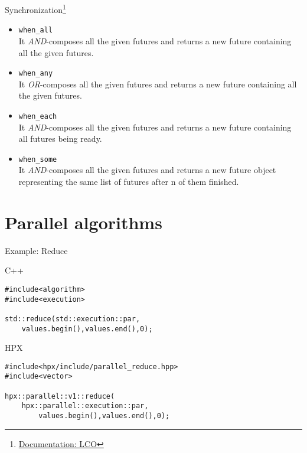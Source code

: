 \documentclass[12pt,t]{beamer}
\begin{document}
\begin{frame}[fragile]{Synchronization\footnote{\tiny\href{https://stellar-group.github.io/hpx/docs/sphinx/latest/html/terminology.html\#term-lco}{Documentation: LCO}}}

\begin{itemize}
\item \lstinline|when_all| \\
It \textit{AND}-composes all the given futures and returns a new future containing all the given futures.
\item \lstinline|when_any| \\
It \textit{OR}-composes all the given futures and returns a new future containing all the given futures.
\item \lstinline|when_each| \\
It \textit{AND}-composes all the given futures and returns a new future containing all futures being ready.
\item \lstinline|when_some| \\
It \textit{AND}-composes all the given futures and returns a new future object representing the same list of futures after n of them finished.

\end{itemize}

\end{frame}


\section{Parallel algorithms}


\begin{frame}[fragile]{Example: Reduce}

\begin{block}{C++}
\begin{lstlisting}
#include<algorithm>
#include<execution>

std::reduce(std::execution::par,
	values.begin(),values.end(),0);
\end{lstlisting}
\end{block}

\begin{block}{HPX}
\begin{lstlisting}
#include<hpx/include/parallel_reduce.hpp>
#include<vector>

hpx::parallel::v1::reduce(
	hpx::parallel::execution::par,
		values.begin(),values.end(),0);

\end{lstlisting}
\end{block}

\end{frame}
\end{document}
